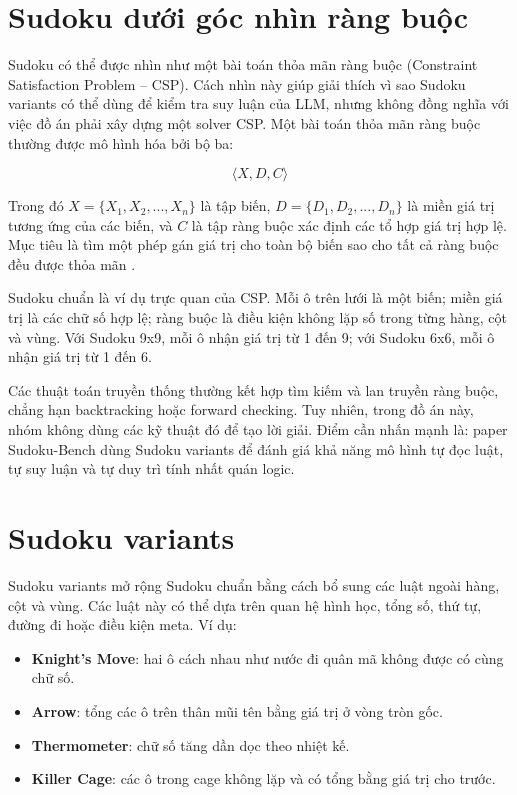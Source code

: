 \documentclass[12pt,a4paper,oneside]{report}
\newlength{\manualparindent}
\newcommand{\manualindent}{\hspace*{\manualparindent}}
\begin{document}
\section{Sudoku dưới góc nhìn ràng buộc}

\manualindent%
Sudoku có thể được nhìn như một bài toán thỏa mãn ràng buộc (Constraint Satisfaction Problem -- CSP). Cách nhìn này giúp giải thích vì sao Sudoku variants có thể dùng để kiểm tra suy luận của LLM, nhưng không đồng nghĩa với việc đồ án phải xây dựng một solver CSP. Một bài toán thỏa mãn ràng buộc thường được mô hình hóa bởi bộ ba:

\[
  \langle X, D, C \rangle
\]

\manualindent%
Trong đó \(X = \{X_1, X_2, ..., X_n\}\) là tập biến, \(D = \{D_1, D_2, ..., D_n\}\) là miền giá trị tương ứng của các biến, và \(C\) là tập ràng buộc xác định các tổ hợp giá trị hợp lệ. Mục tiêu là tìm một phép gán giá trị cho toàn bộ biến sao cho tất cả ràng buộc đều được thỏa mãn \cite{russell-norvig}.

\manualindent%
Sudoku chuẩn là ví dụ trực quan của CSP. Mỗi ô trên lưới là một biến; miền giá trị là các chữ số hợp lệ; ràng buộc là điều kiện không lặp số trong từng hàng, cột và vùng. Với Sudoku 9x9, mỗi ô nhận giá trị từ 1 đến 9; với Sudoku 6x6, mỗi ô nhận giá trị từ 1 đến 6.

\manualindent%
Các thuật toán truyền thống thường kết hợp tìm kiếm và lan truyền ràng buộc, chẳng hạn backtracking hoặc forward checking. Tuy nhiên, trong đồ án này, nhóm không dùng các kỹ thuật đó để tạo lời giải. Điểm cần nhấn mạnh là: paper Sudoku-Bench dùng Sudoku variants để đánh giá khả năng mô hình tự đọc luật, tự suy luận và tự duy trì tính nhất quán logic.

\section{Sudoku variants}

\manualindent%
Sudoku variants mở rộng Sudoku chuẩn bằng cách bổ sung các luật ngoài hàng, cột và vùng. Các luật này có thể dựa trên quan hệ hình học, tổng số, thứ tự, đường đi hoặc điều kiện meta. Ví dụ:

\begin{itemize}
  \item \textbf{Knight's Move}: hai ô cách nhau như nước đi quân mã không được có cùng chữ số.
  \item \textbf{Arrow}: tổng các ô trên thân mũi tên bằng giá trị ở vòng tròn gốc.
  \item \textbf{Thermometer}: chữ số tăng dần dọc theo nhiệt kế.
  \item \textbf{Killer Cage}: các ô trong cage không lặp và có tổng bằng giá trị cho trước.
\end{itemize}
\end{document}
